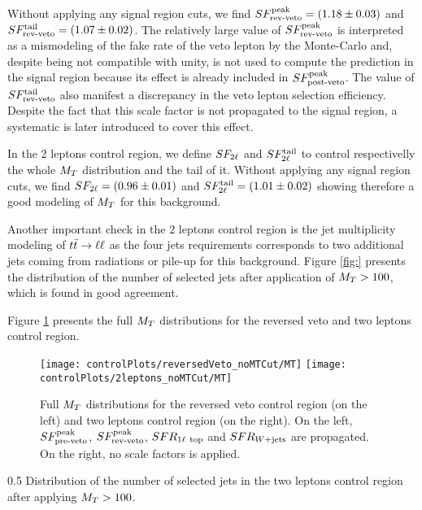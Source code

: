         Without applying any signal region cuts, we find $SF_{\text{rev-veto}}^{\text{peak}} = (1.18 \pm 0.03)$ and
        $SF_{\text{rev-veto}}^{\text{tail}} = (1.07 \pm 0.02)$. The relatively large value of $SF_{\text{rev-veto}}^{\text{peak}}$ is
        interpreted as a mismodeling of the fake rate of the veto lepton by the Monte-Carlo
        and, despite being not compatible with unity, is not used to compute the prediction
        in the signal region because its effect is already included in $SF_{\text{post-veto}}^{\text{peak}}$. The
        value of $SF_{\text{rev-veto}}^{\text{tail}}$ also manifest a discrepancy in the veto lepton selection
        efficiency. Despite the fact that this scale factor is not propagated to the
        signal region, a systematic is later introduced to cover this effect.

        In the 2 leptons control region, we define $SF_{2\ell}$ and $SF_{2\ell}^{\text{tail}}$ to
        control respectivelly the whole $M_T$ distribution and the tail of it.
        Without applying any signal region cuts, we find $SF_{2\ell} = (0.96 \pm 0.01)$
        and $SF_{2\ell}^{\text{tail}} = (1.01 \pm 0.02)$ showing therefore a good modeling of $M_T$
        for this background.

        Another important check in the 2 leptons control region is the jet multiplicity
        modeling of $t\bar{t} \rightarrow \ell \ell$ as the four jets requirements corresponds to two
        additional jets coming from radiations or pile-up for this background.
        Figure \ref{fig:} presents the distribution of the number of selected jets after
        application of $M_T>100$, which is found in good agreement.

        Figure \ref{fig:preselMT2leptonAndLepPlusVeto} presents the full $M_T$
        distributions for the reversed veto and two leptons control region.

        \begin{figure}[h!]
            \centering
            \texttt{[image: controlPlots/reversedVeto\_noMTCut/MT]}
            \texttt{[image: controlPlots/2leptons\_noMTCut/MT]}
            \caption{Full $M_T$ distributions for the reversed veto control region (on the left) and two leptons control region (on the right). On the left, $SF_{\text{pre-veto}}^{\text{peak}}$, $SF_{\text{rev-veto}}^{\text{peak}}$, $SFR_{1\ell~\text{top}}$ and $SFR_{\text{$W$+jets}}$ are propagated. On the right, no scale factors is applied.}
                    \label{fig:preselMT2leptonAndLepPlusVeto}
        \end{figure}

                     {0.5}
                     {Distribution of the number of selected jets in the two leptons control region after applying $M_T > 100$.}


